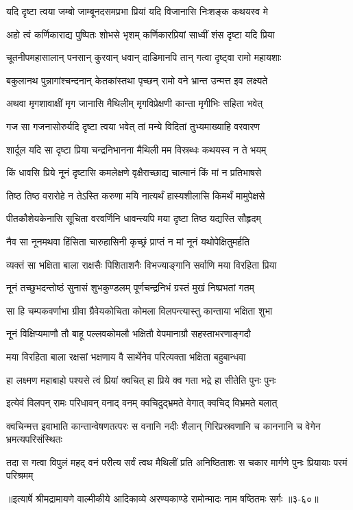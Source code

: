 \twolineshloka
{यदि दृष्टा त्वया जम्बो जाम्बूनदसमप्रभा}
{प्रियां यदि विजानासि निःशङ्क कथयस्व मे} %

\twolineshloka
{अहो त्वं कर्णिकाराद्य पुष्पितः शोभसे भृशम्}
{कर्णिकारप्रियां साध्वीं शंस दृष्टा यदि प्रिया} %

\twolineshloka
{चूतनीपमहासालान् पनसान् कुरवान् धवान्}
{दाडिमानपि तान् गत्वा दृष्ट्वा रामो महायशाः} %

\twolineshloka
{बकुलानथ पुन्नागांश्चन्दनान् केतकांस्तथा}
{पृच्छन् रामो वने भ्रान्त उन्मत्त इव लक्ष्यते} %

\twolineshloka
{अथवा मृगशावाक्षीं मृग जानासि मैथिलीम्}
{मृगविप्रेक्षणी कान्ता मृगीभिः सहिता भवेत्} %

\twolineshloka
{गज सा गजनासोरुर्यदि दृष्टा त्वया भवेत्}
{तां मन्ये विदितां तुभ्यमाख्याहि वरवारण} %

\twolineshloka
{शार्दूल यदि सा दृष्टा प्रिया चन्द्रनिभानना}
{मैथिली मम विस्रब्धः कथयस्व न ते भयम्} %

\twolineshloka
{किं धावसि प्रिये नूनं दृष्टासि कमलेक्षणे}
{वृक्षैराच्छाद्य चात्मानं किं मां न प्रतिभाषसे} %

\twolineshloka
{तिष्ठ तिष्ठ वरारोहे न तेऽस्ति करुणा मयि}
{नात्यर्थं हास्यशीलासि किमर्थं मामुपेक्षसे} %

\twolineshloka
{पीतकौशेयकेनासि सूचिता वरवर्णिनि}
{धावन्त्यपि मया दृष्टा तिष्ठ यद्यस्ति सौहृदम्} %

\twolineshloka
{नैव सा नूनमथवा हिंसिता चारुहासिनी}
{कृच्छ्रं प्राप्तं न मां नूनं यथोपेक्षितुमर्हति} %

\twolineshloka
{व्यक्तं सा भक्षिता बाला राक्षसैः पिशिताशनैः}
{विभज्याङ्गानि सर्वाणि मया विरहिता प्रिया} %

\twolineshloka
{नूनं तच्छुभदन्तोष्ठं सुनासं शुभकुण्डलम्}
{पूर्णचन्द्रनिभं ग्रस्तं मुखं निष्प्रभतां गतम्} %

\twolineshloka
{सा हि चम्पकवर्णाभा ग्रीवा ग्रैवेयकोचिता}
{कोमला विलपन्त्यास्तु कान्ताया भक्षिता शुभा} %

\twolineshloka
{नूनं विक्षिप्यमाणौ तौ बाहू पल्लवकोमलौ}
{भक्षितौ वेपमानाग्रौ सहस्ताभरणाङ्गदौ} %

\twolineshloka
{मया विरहिता बाला रक्षसां भक्षणाय वै}
{सार्थेनेव परित्यक्ता भक्षिता बहुबान्धवा} %

\twolineshloka
{हा लक्ष्मण महाबाहो पश्यसे त्वं प्रियां क्वचित्}
{हा प्रिये क्व गता भद्रे हा सीतेति पुनः पुनः} %

\twolineshloka
{इत्येवं विलपन् रामः परिधावन् वनाद् वनम्}
{क्वचिदुद्भ्रमते वेगात् क्वचिद् विभ्रमते बलात्} %

\threelineshloka
{क्वचिन्मत्त इवाभाति कान्तान्वेषणतत्परः}
{स वनानि नदीः शैलान् गिरिप्रस्रवणानि च}
{काननानि च वेगेन भ्रमत्यपरिसंस्थितः} %

\twolineshloka
{तदा स गत्वा विपुलं महद् वनं परीत्य सर्वं त्वथ मैथिलीं प्रति}
{अनिष्ठिताशः स चकार मार्गणे पुनः प्रियायाः परमं परिश्रमम्} %


॥इत्यार्षे श्रीमद्रामायणे वाल्मीकीये आदिकाव्ये अरण्यकाण्डे रामोन्मादः नाम षष्ठितमः सर्गः ॥३-६०॥

